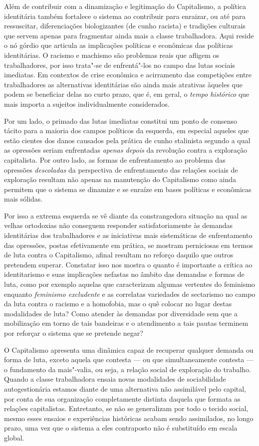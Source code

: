 Além de contribuir com a dinamização e legitimação do Capitalismo, a
política identitária também fortalece o sistema ao contribuir para
enraizar, ou até para ressuscitar, diferenciações biologizantes (de
cunho racista) e tradições culturais que servem apenas para fragmentar
ainda mais a classe trabalhadora. Aqui reside o nó górdio que articula
as implicações políticas e econômicas das políticas identitárias. O
racismo e machismo são problemas reais que afligem os trabalhadores, por
isso trata"-se de enfrentá"-los no campo das lutas sociais imediatas. Em
contextos de crise econômica e acirramento das competições entre
trabalhadores as alternativas identitárias são ainda mais atrativas
àqueles que podem se beneficiar delas no curto prazo, que é, em geral, o
\emph{tempo histórico} que mais importa a sujeitos individualmente
considerados.

Por um lado, o primado das lutas imediatas constitui um ponto de
consenso tácito para a maioria dos campos políticos da esquerda, em
especial aqueles que estão cientes dos danos causados pela prática de
cunho stalinista segundo a qual as opressões seriam enfrentadas
\emph{apenas depois} da revolução contra a exploração capitalista. Por
outro lado, as formas de enfrentamento ao problema das opressões
\emph{descoladas} da perspectiva de enfrentamento das relações sociais
de exploração resultam não apenas na manutenção do Capitalismo como
ainda permitem que o sistema se dinamize e se enraíze em bases políticas
e econômicas mais sólidas.

Por isso a extrema esquerda se vê diante da constrangedora situação na
qual as velhas ortodoxias não conseguem responder satisfatoriamente às
demandas identitárias dos trabalhadores e as iniciativas mais
sistemáticas de enfrentamento das opressões, postas efetivamente em
prática, se mostram perniciosas em termos de luta contra o Capitalismo,
afinal resultam no reforço daquilo que outros pretendem superar.
Constatar isso nos mostra o quanto é importante a crítica ao
identitarismo e suas implicações nefastas no âmbito das demandas e
formas de luta, como por exemplo aquelas que caracterizam algumas
vertentes do feminismo enquanto \emph{feminismo excludente} e as
correlatas variedades de sectarismo no campo da luta contra o racismo e
a homofobia, mas o quê colocar no lugar destas modalidades de luta? Como
atender às demandas por diversidade sem que a mobilização em torno de
tais bandeiras e o atendimento a tais pautas terminem por reforçar o
sistema que se pretende negar?

O Capitalismo apresenta uma dinâmica capaz de recuperar qualquer demanda
ou forma de luta, exceto aquela que contesta --- ou que simultaneamente
contesta --- o fundamento da mais"-valia, ou seja, a relação social de
exploração do trabalho. Quando a classe trabalhadora ensaia novas
modalidades de sociabilidade autogestionária estamos diante de uma
alternativa não assimilável pelo capital, por conta de sua organização
completamente distinta daquela que formata as relações capitalistas.
Entretanto, se não se generalizam por todo o tecido social, mesmo esses
ensaios e experiências históricas acabam sendo assimilados, no longo
prazo, uma vez que o sistema a eles contraposto não é substituído em
escala global.

